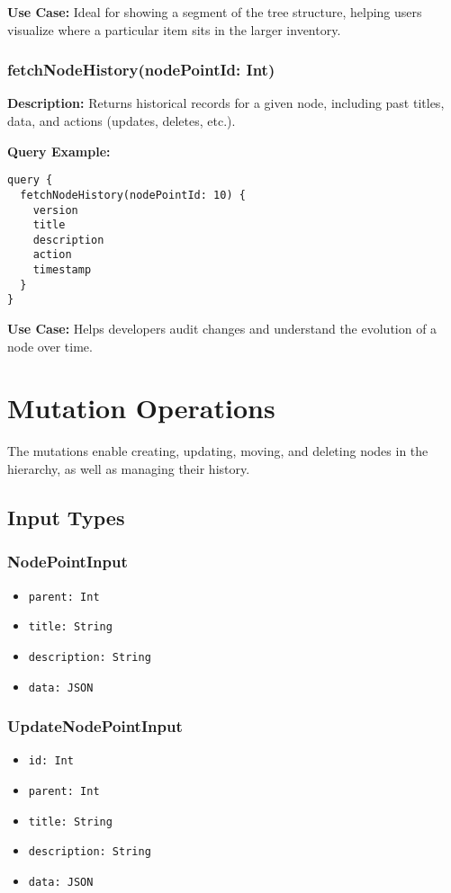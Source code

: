 \documentclass[12pt,a4paper]{article}
\begin{document}
\noindent \textbf{Use Case:}
Ideal for showing a segment of the tree structure, helping users visualize where a particular item sits in the larger inventory.

\subsubsection{fetchNodeHistory(nodePointId: Int)}
\textbf{Description:}
Returns historical records for a given node, including past titles, data, and actions (updates, deletes, etc.).

\noindent \textbf{Query Example:}
\begin{verbatim}
query {
  fetchNodeHistory(nodePointId: 10) {
    version
    title
    description
    action
    timestamp
  }
}
\end{verbatim}

\noindent \textbf{Use Case:}
Helps developers audit changes and understand the evolution of a node over time.

\section{Mutation Operations}
The mutations enable creating, updating, moving, and deleting nodes in the hierarchy, as well as managing their history.

\subsection{Input Types}
\subsubsection{NodePointInput}
\begin{itemize}
    \item \texttt{parent: Int}
    \item \texttt{title: String}
    \item \texttt{description: String}
    \item \texttt{data: JSON}
\end{itemize}

\subsubsection{UpdateNodePointInput}
\begin{itemize}
    \item \texttt{id: Int}
    \item \texttt{parent: Int}
    \item \texttt{title: String}
    \item \texttt{description: String}
    \item \texttt{data: JSON}
\end{itemize}
\end{document}
